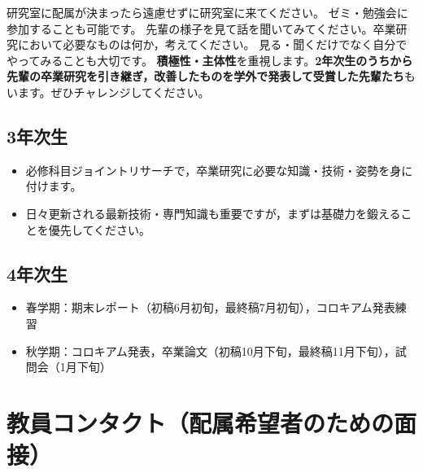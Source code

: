 \documentclass[paper=a4paper,fontsize=10.4pt]{jlreq}
\renewcommand{\emph}[1]{\textbf{#1}}
\begin{document}
研究室に配属が決まったら遠慮せずに研究室に来てください。
ゼミ・勉強会に参加することも可能です。
先輩の様子を見て話を聞いてみてください。卒業研究において必要なものは何か，考えてください。
見る・聞くだけでなく自分でやってみることも大切です。
\emph{積極性・主体性}を重視します。\emph{2年次生のうちから先輩の卒業研究を引き継ぎ，改善したものを学外で発表して受賞した先輩たち}もいます。ぜひチャレンジしてください。

\subsection*{3年次生}
\vspace{-.2cm}
\begin{itemize}[topsep=0pt]
  \item 必修科目ジョイントリサーチで，卒業研究に必要な知識・技術・姿勢を身に付けます。
  \item 日々更新される最新技術・専門知識も重要ですが，まずは基礎力を鍛えることを優先してください。
\end{itemize}

\subsection*{4年次生}
\begin{itemize}[topsep=0pt]
  \item 春学期：期末レポート（初稿6月初旬，最終稿7月初旬），コロキアム発表練習
  \item 秋学期：コロキアム発表，卒業論文（初稿10月下旬，最終稿11月下旬），試問会（1月下旬）
\end{itemize}

\section{教員コンタクト（配属希望者のための面接）}
\end{document}
